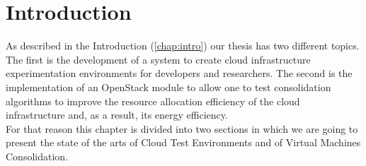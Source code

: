 




\section{Introduction}
\label{sec:sota_intro}
As described in the Introduction (\ref{chap:intro}) our thesis has two different topics. The first is the development of a system to create cloud infrastructure experimentation environments for developers and researchers. The second is the implementation of an OpenStack module to allow one to test consolidation algorithms to improve the resource allocation efficiency of the cloud infrastructure and, as a result, its energy efficiency.\\
For that reason this chapter is divided into two sections in which we are going to present the state of the arts of Cloud Test Environments and of Virtual Machines Consolidation.



